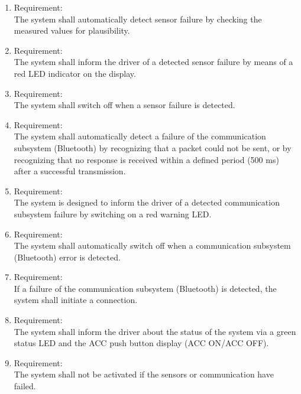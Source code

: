 \begin{enumerate}[label*=\arabic*.]
        \item \label{req.2} Requirement: \\
        The system shall automatically detect sensor failure by checking the measured values for plausibility.  \\
	 	\item \label{req.3} Requirement: \\
        The system shall inform the driver of a detected sensor failure by means of a red LED indicator on the display. \\
        \item \label{req.4} Requirement: \\
        The system shall switch off when a sensor failure is detected. \\
        \item \label{req.5} Requirement: \\
        The system shall automatically detect a failure of the communication subsystem (Bluetooth) by recognizing that a packet could not be sent, or by recognizing that no response is received within a defined period (500 ms) after a successful transmission. \\
        \item \label{req.6} Requirement: \\
        The system is designed to inform the driver of a detected communication subsystem failure by switching on a red warning LED. \\
        \item \label{req.7} Requirement: \\
        The system shall automatically switch off when a communication subsystem (Bluetooth) error is detected. \\
        \item \label{req.8} Requirement: \\
        If a failure of the communication subsystem (Bluetooth) is detected, the system shall initiate a connection. \\
        \item \label{req.9} Requirement: \\
        The system shall inform the driver about the status of the system via a green status LED and the ACC push button display (ACC ON/ACC OFF). \\
        \item \label{req.10} Requirement: \\
        The system shall not be activated if the sensors or communication have failed. \\

\end{enumerate}

